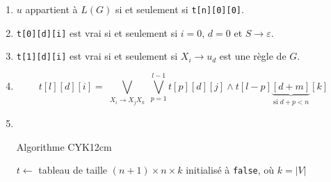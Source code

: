\documentclass[preview, convert={outfile=\jobname.png}]{standalone}
\begin{document}
\begin{enumerate}
    \item $u$ appartient à $L(G)$ si et seulement si \texttt{t[n][0][0]}.
    \item \texttt{t[0][d][i]} est vrai si et seulement si $i = 0$, $d = 0$ et $S \rightarrow \varepsilon$.
    \item \texttt{t[1][d][i]} est vrai si et seulement si $X_i \rightarrow u_d$ est une règle de $G$.
    \item $$t[l][d][i] = {\bigvee_{\substack{X_i \rightarrow X_j X_k}} \bigvee_{p = 1}^{l-1} t[p][d][j] \land t[l-p]\underbrace{[d+m]}_{\text{si }d + p < n}[k]}$$
    \item ~\\
    \begin{algo2}{Algorithme CYK}{12cm}
        \;

        $t \longleftarrow$ tableau de taille $(n + 1) \times n \times k$ initialisé à \texttt{false}, où $k = |V|$\;
    \end{algo2}
\end{enumerate}
\end{document}
